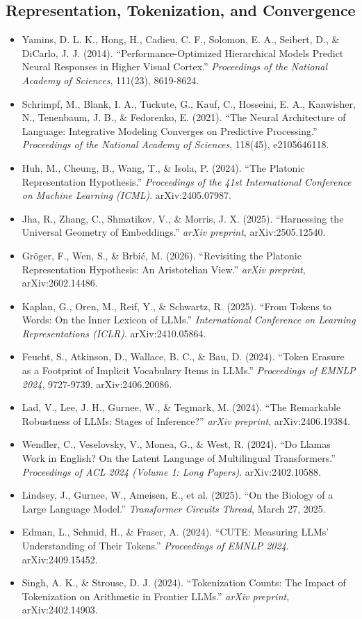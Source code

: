 \documentclass[11pt,letterpaper]{article}
\begin{document}
\subsection*{Representation, Tokenization, and Convergence}
\begin{itemize}[leftmargin=1.5em]
  \item Yamins, D. L. K., Hong, H., Cadieu, C. F., Solomon, E. A., Seibert, D., \& DiCarlo, J. J. (2014). ``Performance-Optimized Hierarchical Models Predict Neural Responses in Higher Visual Cortex.'' \textit{Proceedings of the National Academy of Sciences}, 111(23), 8619-8624.
  \item Schrimpf, M., Blank, I. A., Tuckute, G., Kauf, C., Hosseini, E. A., Kanwisher, N., Tenenbaum, J. B., \& Fedorenko, E. (2021). ``The Neural Architecture of Language: Integrative Modeling Converges on Predictive Processing.'' \textit{Proceedings of the National Academy of Sciences}, 118(45), e2105646118.
  \item Huh, M., Cheung, B., Wang, T., \& Isola, P. (2024). ``The Platonic Representation Hypothesis.'' \textit{Proceedings of the 41st International Conference on Machine Learning (ICML)}. arXiv:2405.07987.
  \item Jha, R., Zhang, C., Shmatikov, V., \& Morris, J. X. (2025). ``Harnessing the Universal Geometry of Embeddings.'' \textit{arXiv preprint}, arXiv:2505.12540.
  \item Gr\"{o}ger, F., Wen, S., \& Brbi\'{c}, M. (2026). ``Revisiting the Platonic Representation Hypothesis: An Aristotelian View.'' \textit{arXiv preprint}, arXiv:2602.14486.
  \item Kaplan, G., Oren, M., Reif, Y., \& Schwartz, R. (2025). ``From Tokens to Words: On the Inner Lexicon of LLMs.'' \textit{International Conference on Learning Representations (ICLR)}. arXiv:2410.05864.
  \item Feucht, S., Atkinson, D., Wallace, B. C., \& Bau, D. (2024). ``Token Erasure as a Footprint of Implicit Vocabulary Items in LLMs.'' \textit{Proceedings of EMNLP 2024}, 9727-9739. arXiv:2406.20086.
  \item Lad, V., Lee, J. H., Gurnee, W., \& Tegmark, M. (2024). ``The Remarkable Robustness of LLMs: Stages of Inference?'' \textit{arXiv preprint}, arXiv:2406.19384.
  \item Wendler, C., Veselovsky, V., Monea, G., \& West, R. (2024). ``Do Llamas Work in English? On the Latent Language of Multilingual Transformers.'' \textit{Proceedings of ACL 2024 (Volume 1: Long Papers)}. arXiv:2402.10588.
  \item Lindsey, J., Gurnee, W., Ameisen, E., et al. (2025). ``On the Biology of a Large Language Model.'' \textit{Transformer Circuits Thread}, March 27, 2025.
  \item Edman, L., Schmid, H., \& Fraser, A. (2024). ``CUTE: Measuring LLMs' Understanding of Their Tokens.'' \textit{Proceedings of EMNLP 2024}. arXiv:2409.15452.
  \item Singh, A. K., \& Strouse, D. J. (2024). ``Tokenization Counts: The Impact of Tokenization on Arithmetic in Frontier LLMs.'' \textit{arXiv preprint}, arXiv:2402.14903.
\end{itemize}
\end{document}
